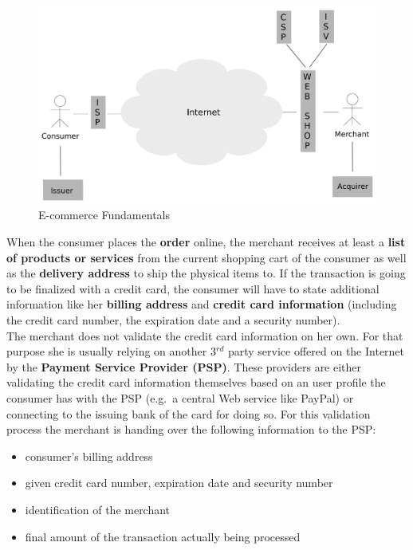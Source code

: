 \begin{figure}[H]
	\centering
		\includegraphics[width=0.8\columnwidth]{images/e-commerce-scenario.pdf}
	\caption{E-commerce Fundamentals}
\label{fig:images_ecommerce_scenario}
\end{figure}

When the consumer places the \textbf{order} online, the merchant receives at least a \textbf{list of products or services} from the current shopping cart of the consumer as well as the \textbf{delivery address} to ship the physical items to. If the transaction is going to be finalized with a credit card, the consumer will have to state additional information like her \textbf{billing address} and \textbf{credit card information} (including the credit card number, the expiration date and a security number). \\
The merchant does not validate the credit card information on her own. For that purpose she is usually relying on another 3$^{rd}$ party service offered on the Internet by the \textbf{Payment Service Provider (\gls{PSP})}. These providers are either validating the credit card information themselves based on an user profile the consumer has with the PSP (e.g.\ a central Web service like PayPal) or connecting to the issuing bank of the card for doing so. For this validation process the merchant is handing over the following information to the PSP:\@

\begin{itemize}
    \item consumer's billing address
    \item given credit card number, expiration date and security number
    \item identification of the merchant
    \item final amount of the transaction actually being processed
\end{itemize}

